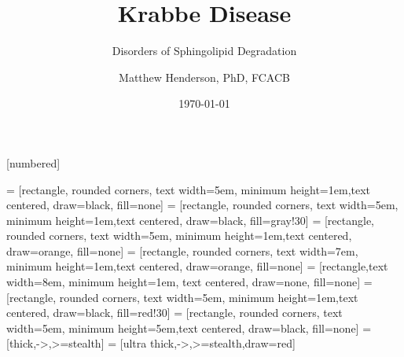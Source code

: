 \documentclass[presentation, smaller]{beamer}
\author{Matthew Henderson, PhD, FCACB}
\date{\today}
\title{Krabbe Disease}
\subtitle{Disorders of Sphingolipid Degradation}
\institute[NSO]{Newborn Screening Ontario | The University of Ottawa}
\begin{document}
\maketitle


\vspace{220pt}
\beamertemplatenavigationsymbolsempty
{}[numbered]

 = [rectangle, rounded corners, text width=5em, minimum height=1em,text centered, draw=black, fill=none]
 = [rectangle, rounded corners, text width=5em, minimum height=1em,text centered, draw=black, fill=gray!30]
 = [rectangle, rounded corners, text width=5em, minimum height=1em,text centered, draw=orange, fill=none]
 = [rectangle, rounded corners, text width=7em, minimum height=1em,text centered, draw=orange, fill=none]
 = [rectangle,text width=8em, minimum height=1em, text centered, draw=none, fill=none]
 = [rectangle, rounded corners, text width=5em, minimum height=1em,text centered, draw=black, fill=red!30]
 = [rectangle, rounded corners, text width=5em, minimum height=5em,text centered, draw=black, fill=none]
 = [thick,->,>=stealth]
 = [ultra thick,->,>=stealth,draw=red]
\end{document}
